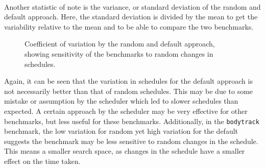\documentclass{article}
\newcommand{\n}[0]{\\[\baselineskip]}
\begin{document}
\n
Another statistic of note is the variance, or standard deviation of the random and default approach. Here, the standard deviation is divided by the mean to get the variability relative to the mean and to be able to compare the two benchmarks.
\begin{figure}[H]
\centering
{}
\caption{Coefficient of variation by the random and default approach, showing sensitivity of the benchmarks to random changes in schedules.}
\label{fig:variance}
\end{figure}
\noindent Again, it can be seen that the variation in schedules for the default approach is not necessarily better than that of random schedules. This may be due to some mistake or assumption by the scheduler which led to slower schedules than expected. A certain approach by the scheduler may be very effective for other benchmarks, but less useful for these benchmarks. Additionally, in the \texttt{bodytrack} benchmark, the low variation for random yet high variation for the default suggests the benchmark may be less sensitive to random changes in the schedule. This means a smaller search space, as changes in the schedule have a smaller effect on the time taken.
\end{document}
